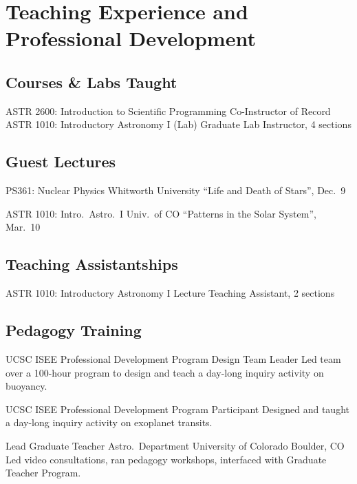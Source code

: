 \section{Teaching Experience and Professional Development}

\subsection{Courses \& Labs Taught}

		{ASTR 2600: Introduction to Scientific Programming}
		{Co-Instructor of Record}
		{}
		{}
        {}
        {ASTR 1010: Introductory Astronomy I (Lab)}
        {Graduate Lab Instructor, 4 sections}
        {}
        {}
        {}

\vspace{0.25cm}
\subsection{Guest Lectures}

        {PS361: Nuclear Physics}
        {Whitworth University}
        {``Life and Death of Stars'', Dec.~9}
        {}
        {}

        {ASTR 1010: Intro.~Astro.~I}
        {Univ.~of CO}
        {``Patterns in the Solar System'', Mar.~10}
        {}
        {}





\vspace{0.25cm}
\subsection{Teaching Assistantships}

        {ASTR 1010: Introductory Astronomy I}
        {Lecture Teaching Assistant, 2 sections}
        {}
        {}
        {}

\vspace{0.25cm}
\subsection{Pedagogy Training}

		{UCSC ISEE Professional Development Program}
		{Design Team Leader}
		{}
		{}
		{Led team over a 100-hour program to design and teach a day-long inquiry activity on buoyancy.}

		{UCSC ISEE Professional Development Program}
		{Participant}
		{}
		{}
		{Designed and taught a day-long inquiry activity on exoplanet transits.}

		{Lead Graduate Teacher}
		{Astro.~Department}
		{University of Colorado}
		{Boulder, CO}
		{Led video consultations, ran pedagogy workshops, interfaced with Graduate Teacher Program.}


